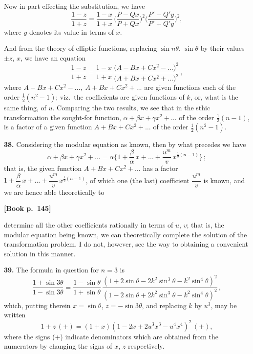 \documentclass[11pt]{article}
\begin{document}
Now in part effecting the substitution, we have
\[
\frac{1-z}{1+z} = \frac{1-x}{1+x}\,\biggl(\frac{P-Qx}{P+Qx}\biggr)^{\!2}\biggl(\frac{P'-Q' y}{P'+Q' y}\biggr)^{\!2},
\]
where $y$ denotes its value in terms of $x$.

And from the theory of elliptic functions, replacing $\sin n\theta$, $\sin\theta$
by their values $\pm z$, $x$, we have an equation
\[
\frac{1-z}{1+z} = \frac{1-x}{1+x}\,\frac{\bigl(A-Bx+Cx^2-\ldots\bigr)^2}{\bigl(A+Bx+Cx^2+\ldots\bigr)^2}\,,
\]
where $A-Bx+Cx^2-\ldots,\;A+Bx+Cx^2+\ldots$ are given functions each of the order
$\tfrac{1}{2}(n^2-1)$; viz.\ the coefficients are given functions of $k$, or, what is the
same thing, of $u$. Comparing the two results, we see that in the sthic transformation
the sought-for function, $\alpha+\beta x+\gamma x^2+\ldots$ of the order $\tfrac{1}{2}(n-1)$, is a factor of a given function
$A+Bx+Cx^2+\ldots$ of the order $\tfrac{1}{2}(n^2-1)$.

\medskip

\textbf{38.} Considering the modular equation as known, then by what precedes we have
\[
\alpha+\beta x+\gamma x^2+\ldots = \alpha\biggl\{1+\frac{\beta}{\alpha}\,x+\ldots+\frac{u^m}{v}\,x^{\frac{1}{2}(n-1)}\biggr\}\,;
\]
that is, the given function $A+Bx+Cx^2+\ldots$ has a factor $1+\dfrac{\beta}{\alpha}\,x+\ldots+\dfrac{u^m}{v}\,x^{\frac{1}{2}(n-1)}$,
of which one (the last) coefficient $\dfrac{u^m}{v}$ is known, and we are hence able theoretically to

\bigskip

\noindent\textbf{[Book p.~145]}

\medskip

\noindent
determine all the other coefficients rationally in terms of $u,\,v$; that is, the
modular equation being known, we can theoretically complete the solution of the
transformation problem. I do not, however, see the way to obtaining a convenient
solution in this manner.

\medskip

\textbf{39.} The formula in question for $n=3$ is
\[
\frac{1+\sin 3\theta}{1-\sin 3\theta} = \frac{1-\sin\theta}{1+\sin\theta}\,\frac{(1+2\sin\theta-2k^2\sin^3\theta-k^2\sin^4\theta)^2}{(1-2\sin\theta+2k^2\sin^3\theta-k^2\sin^4\theta)^2}\,,
\]
which, putting therein $x=\sin\theta$, $z=-\sin 3\theta$, and replacing $k$ by $u^3$, may be written
\[
1 + z\,(+) = (1+x)(1 - 2x + 2u^3 x^3 - u^4 x^4)^2\,(+),
\]
where the signs (+) indicate denominators which are obtained from the numerators by
changing the signs of $x,\,z$ respectively.
\end{document}

